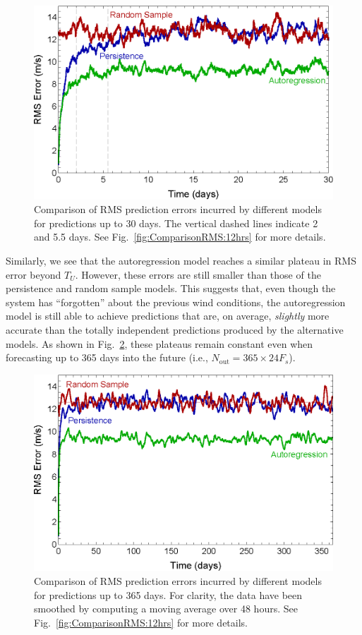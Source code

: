 \documentclass[11pt, oneside]{article}
\newcommand{\figref}[1]{Fig.~\ref{#1}}
\begin{document}
\begin{figure}[htb]
\centering
\includegraphics[width=0.7\columnwidth]{figures/ComparisonRMSPredictionError_30days}
\caption{Comparison of RMS prediction errors incurred by different models for predictions up to 30 days.
The vertical dashed lines indicate 2 and 5.5 days.
See \figref{fig:ComparisonRMS:12hrs} for more details.}
\label{fig:ComparisonRMS:30days}
\end{figure}

Similarly, we see that the autoregression model reaches a similar plateau in RMS error beyond $T_U$.
However, these errors are still smaller than those of the persistence and random sample models.
This suggests that, even though the system has ``forgotten'' about the previous wind conditions, the autoregression model is still able to achieve predictions that are, on average, \textit{slightly} more accurate than the totally independent predictions produced by the alternative models.
As shown in \figref{fig:ComparisonRMS:365days}, these plateaus remain constant even when forecasting up to 365 days into the future (i.e., $N_\text{out} = 365 \times 24 F_s$).

\begin{figure}[htb]
\centering
\includegraphics[width=0.7\columnwidth]{figures/ComparisonRMSPredictionError_365days}
\caption{Comparison of RMS prediction errors incurred by different models for predictions up to 365 days.
For clarity, the data have been smoothed by computing a moving average over 48 hours.
See \figref{fig:ComparisonRMS:12hrs} for more details.}
\label{fig:ComparisonRMS:365days}
\end{figure}
\end{document}
